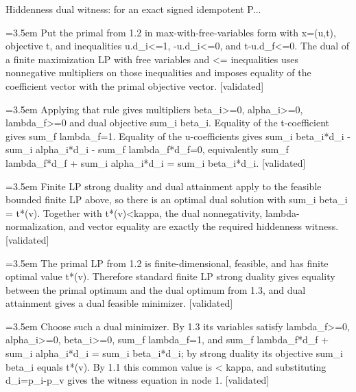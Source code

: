 \documentclass{article}
\newcommand{\step}[1]{\par\noindent\hangindent=3.5em\hangafter=1%
  \makebox[3.5em][l]{\textbf{#1.}}}
\newcommand{\steptag}[1]{\hfill{\small\textsf{[#1]}}}
\begin{document}
\begin{proofbox}{Hiddenness dual witness: for an exact signed idempotent P...}
\step{1.3.1} Put the primal from 1.2 in max-with-free-variables form with x=(u,t), objective t, and inequalities u.d\_i<=1, -u.d\_i<=0, and t-u.d\_f<=0. The dual of a finite maximization LP with free variables and <= inequalities uses nonnegative multipliers on those inequalities and imposes equality of the coefficient vector with the primal objective vector. \steptag{validated} \\[4pt]
\step{1.3.2} Applying that rule gives multipliers beta\_i>=0, alpha\_i>=0, lambda\_f>=0 and dual objective sum\_i beta\_i. Equality of the t-coefficient gives sum\_f lambda\_f=1. Equality of the u-coefficients gives sum\_i beta\_i*d\_i - sum\_i alpha\_i*d\_i - sum\_f lambda\_f*d\_f=0, equivalently sum\_f lambda\_f*d\_f + sum\_i alpha\_i*d\_i = sum\_i beta\_i*d\_i. \steptag{validated} \\[4pt]
\step{1.4} Finite LP strong duality and dual attainment apply to the feasible bounded finite LP above, so there is an optimal dual solution with sum\_i beta\_i = t*(v). Together with t*(v)<kappa, the dual nonnegativity, lambda-normalization, and vector equality are exactly the required hiddenness witness. \steptag{validated} \\[6pt]
\step{1.4.1} The primal LP from 1.2 is finite-dimensional, feasible, and has finite optimal value t*(v). Therefore standard finite LP strong duality gives equality between the primal optimum and the dual optimum from 1.3, and dual attainment gives a dual feasible minimizer. \steptag{validated} \\[4pt]
\step{1.4.2} Choose such a dual minimizer. By 1.3 its variables satisfy lambda\_f>=0, alpha\_i>=0, beta\_i>=0, sum\_f lambda\_f=1, and sum\_f lambda\_f*d\_f + sum\_i alpha\_i*d\_i = sum\_i beta\_i*d\_i; by strong duality its objective sum\_i beta\_i equals t*(v). By 1.1 this common value is < kappa, and substituting d\_i=p\_i-p\_v gives the witness equation in node 1. \steptag{validated} \\[4pt]
\end{proofbox}
\end{document}
